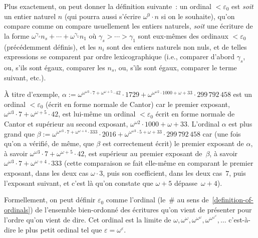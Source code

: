 \documentclass[12pt,a4paper]{article}
\theoremstyle{definition}
\begin{document}
Plus exactement, on peut donner la définition suivante :
un ordinal $<\varepsilon_0$ est \emph{soit} un entier
naturel $n$ (qui pourra aussi s'écrire $\omega^0\cdot n$ si on le
souhaite), qu'on compare comme on compare usuellement les entiers
naturels, \emph{soit} une écriture de la forme $\omega^{\gamma_s} n_s
+ \cdots + \omega^{\gamma_1} n_1$ où $\gamma_s > \cdots > \gamma_1$
sont eux-mêmes des ordinaux $<\varepsilon_0$ (précédemment définis),
et les $n_i$ sont des entiers naturels non nuls, et de telles
expressions se comparent par ordre lexicographique (i.e., comparer
d'abord $\gamma_s$, ou, s'ils sont égaux, comparer les $n_s$, ou,
s'ils sont égaux, comparer le terme suivant, etc.).

À titre d'exemple, $\alpha := \omega^{\omega^{\omega 3}\cdot 7 +
  \omega^{\omega+5}\cdot 42}\cdot 1729 + \omega^{\omega^{\omega
    2}\cdot 1000 + \omega + 33}\cdot 299\,792\,458$ est un ordinal
$<\varepsilon_0$ (écrit en forme normale de Cantor) car le premier
exposant, $\omega^{\omega 3}\cdot 7 + \omega^{\omega+5}\cdot 42$, est
lui-même un ordinal $<\varepsilon_0$ écrit en forme normale de Cantor
et supérieur au second exposant, $\omega^{\omega 2}\cdot 1000 + \omega
+ 33$.  L'ordinal $\alpha$ est plus grand que $\beta :=
\omega^{\omega^{\omega 3}\cdot 7 + \omega^{\omega+4}\cdot 333}\cdot
2016 + \omega^{\omega^{\omega 3}\cdot 5 + \omega + 33}\cdot
299\,792\,458$ car (une fois qu'on a vérifié, de même, que $\beta$ est
correctement écrit) le premier exposant de $\alpha$, à savoir
$\omega^{\omega 3}\cdot 7 + \omega^{\omega+5}\cdot 42$, est supérieur
au premier exposant de $\beta$, à savoir $\omega^{\omega 3}\cdot 7 +
\omega^{\omega+4}\cdot 333$ (cette comparaison se fait elle-même en
comparant le premier exposant, dans les deux cas $\omega\cdot 3$, puis
son coefficient, dans les deux cas $7$, puis l'exposant suivant, et
c'est là qu'on constate que $\omega+5$ dépasse $\omega+4$).

Formellement, on peut définir $\varepsilon_0$ comme l'ordinal (le $\#$
au sens de \ref{definition-of-ordinals}) de l'ensemble bien-ordonné
des écritures qu'on vient de présenter pour l'ordre qu'on vient de
dire.  Cet ordinal est la limite de
$\omega,\omega^\omega,\omega^{\omega^\omega},\omega^{\omega^{\omega^\omega}},\ldots$
c'est-à-dire le plus petit ordinal tel que $\varepsilon =
\omega^\varepsilon$.
\end{document}
